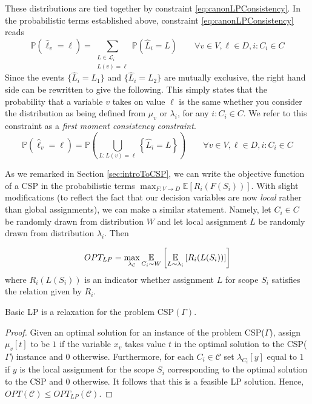 These distributions are tied together by constraint \ref{eq:canonLPConsistency}. In the probabilistic terms established above, constraint \ref{eq:canonLPConsistency} reads
\begin{equation}
\mathbb{P}\left( \hat{\ell}_v = \ell \right) = \sum_{\substack{L \in \mathcal{L}_i \\ L(v) = \ell}} \mathbb{P}\left( \hat{L}_i = L \right) \qquad \forall v \in V, \ell \in D, i : C_i \in C
\end{equation}
Since the events  $\{\hat{L}_i = L_1 \}$ and $\{\hat{L}_i = L_2 \}$ are mutually exclusive, the right hand side can be rewritten to give the following. This simply states that the probability that a variable $v$ takes on value $\ell$ is the same whether you consider the distribution as being defined from $\mu_v$ or $\lambda_i$, for any $i : C_i \in C$. We refer to this constraint as a \textit{first moment consistency constraint}.
\begin{equation} 
\mathbb{P}\left( \hat{\ell}_v = \ell \right) = \mathbb{P}\left( \bigcup_{L : L(v) =  \ell} \left\{\hat{L}_i = L\right\} \right) \qquad \forall v \in V, \ell \in D, i : C_i \in C
\end{equation}

As we remarked in Section \ref{sec:introToCSP}, we can write the objective function of a CSP in the probabilistic terms $\max_{F : V \to D} \mathbb{E}\left[ R_i(F(S_i)) \right]$. With slight modifications (to reflect the fact that our decision variables are now \textit{local} rather than global assignments), we can make a similar statement. Namely, let $C_i \in C$ be randomly drawn from distribution $W$ and let local assignment $L$ be randomly drawn from distribution $\lambda_i$. Then 

\[
	OPT_{LP} = \max_{\lambda_{\mathcal{C}}} \underset{C_i \sim W}{\mathbb{E}} \left[ \underset{L \sim \lambda_{i}}{\mathbb{E}} \left[ R_i( L (S_i )) \right] \right]
\]
where $R_i( L (S_i ))$ is an indicator whether assignment $L$ for scope $S_i$ satisfies the relation given by $R_i$.

\begin{thm}
	Basic LP is a relaxation for the problem CSP$(\Gamma)$.
\end{thm}
\begin{proof}
	Given an optimal solution for an instance of the problem CSP($\Gamma$), assign $\mu_v[t]$ to be $1$ if the variable $x_v$ takes value $t$ in the optimal solution to the CSP($\Gamma$) instance and $0$ otherwise.
	Furthermore, for each $C_i \in \mathcal{C}$ set $\lambda_{C_i}[y]$ equal to $1$ if $y$ is the local assignment for the scope $S_i$ corresponding to the optimal solution to the CSP and $0$ otherwise. 
	It follows that this is a feasible LP solution. 
	Hence, $OPT(\mathcal{C}) \le OPT_{LP}(\mathcal{C})$.
\end{proof}

